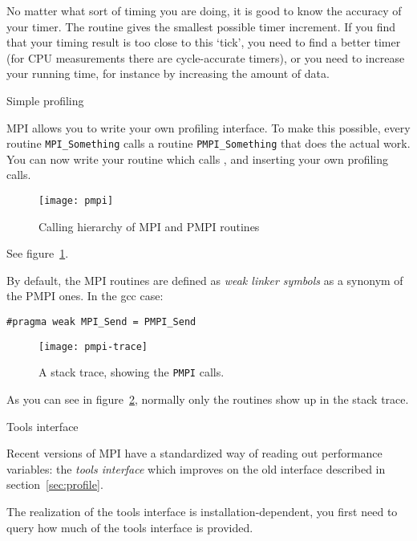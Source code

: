 No matter what sort of timing you are doing, it is good to know the accuracy of your timer.
The routine  gives the smallest possible timer increment.
If you find that your timing result is too close to this `tick', you need to find a better timer
(for CPU measurements there are cycle-accurate timers), or you need to increase
your running time, for instance by increasing the amount of data.


 {Simple profiling}
\label{sec:profile}

MPI allows you to write your own profiling interface. To make this possible,
every routine \lstinline{MPI_Something} calls a routine \lstinline{PMPI_Something} that 
does the actual work. You can now write your  routine
which calls , and inserting your own profiling calls.
\begin{figure}[ht]
  \texttt{[image: pmpi]}
  \caption{Calling hierarchy of MPI and PMPI routines}
  \label{fig:pmpi-call}
\end{figure}
See figure~\ref{fig:pmpi-call}.

By default, the MPI routines are defined
as
\emph{weak linker symbols}
as a synonym of the PMPI ones. In the gcc case:
\begin{verbatim}
#pragma weak MPI_Send = PMPI_Send
\end{verbatim}
\begin{figure}[ht]
  \texttt{[image: pmpi-trace]}
  \caption{A stack trace, showing the \texttt{PMPI} calls.}
  \label{fig:pmpi-trace}
\end{figure}
As you can see in figure~\ref{fig:pmpi-trace}, normally only the  routines
show up in the stack trace.


 {Tools interface}

Recent versions of MPI have a standardized way of reading out
performance variables: the \emph{tools interface}
which improves on the old interface described in section~\ref{sec:profile}.

The realization of the tools interface is installation-dependent,
you first need to query how much of the tools interface is provided.


